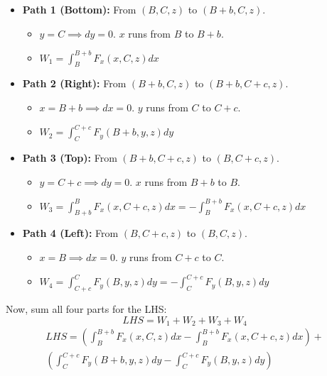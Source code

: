 \documentclass[11pt, a4paper]{article} %
\begin{document}
\begin{itemize}
    \item \textbf{Path 1 (Bottom):} From $(B, C, z)$ to $(B+b, C, z)$.
    \begin{itemize}
        \item $y=C \implies dy=0$. $x$ runs from $B$ to $B+b$.
        \item $W_1 = \int_B^{B+b} F_x(x, C, z) dx$
    \end{itemize}
    \item \textbf{Path 2 (Right):} From $(B+b, C, z)$ to $(B+b, C+c, z)$.
    \begin{itemize}
        \item $x=B+b \implies dx=0$. $y$ runs from $C$ to $C+c$.
        \item $W_2 = \int_C^{C+c} F_y(B+b, y, z) dy$
    \end{itemize}
    \item \textbf{Path 3 (Top):} From $(B+b, C+c, z)$ to $(B, C+c, z)$.
    \begin{itemize}
        \item $y=C+c \implies dy=0$. $x$ runs from $B+b$ to $B$.
        \item $W_3 = \int_{B+b}^B F_x(x, C+c, z) dx = - \int_B^{B+b} F_x(x, C+c, z) dx$
    \end{itemize}
    \item \textbf{Path 4 (Left):} From $(B, C+c, z)$ to $(B, C, z)$.
    \begin{itemize}
        \item $x=B \implies dx=0$. $y$ runs from $C+c$ to $C$.
        \item $W_4 = \int_{C+c}^C F_y(B, y, z) dy = - \int_C^{C+c} F_y(B, y, z) dy$
    \end{itemize}
\end{itemize}

Now, sum all four parts for the LHS:
$$LHS = W_1 + W_2 + W_3 + W_4$$
\begin{align*}
    LHS = \left( \int_B^{B+b} F_x(x, C, z) dx - \int_B^{B+b} F_x(x, C+c, z) dx \right) +\\ \left( \int_C^{C+c} F_y(B+b, y, z) dy - \int_C^{C+c} F_y(B, y, z) dy \right)
\end{align*}
\end{document}
